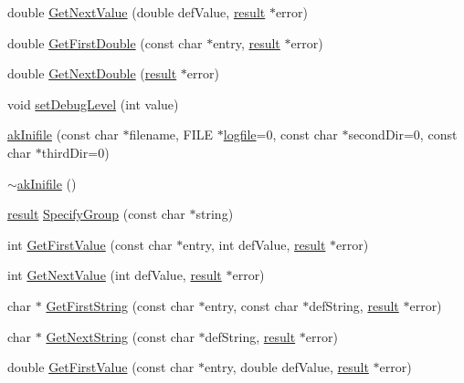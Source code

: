 \begin{DoxyCompactItemize}
\item 
double \hyperlink{classakInifile_a563076300ca6e4dd46850b27bc326aa6}{Get\-Next\-Value} (double def\-Value, \hyperlink{classInifile_a42a1cfa6fc8618c8b28d449626f0ecde}{result} $\ast$error)
\item 
double \hyperlink{classakInifile_a8121e22f645f39782132d198edc7ebd7}{Get\-First\-Double} (const char $\ast$entry, \hyperlink{classInifile_a42a1cfa6fc8618c8b28d449626f0ecde}{result} $\ast$error)
\item 
double \hyperlink{classakInifile_ad9c214f487ee936f5f8e83851a8e74e2}{Get\-Next\-Double} (\hyperlink{classInifile_a42a1cfa6fc8618c8b28d449626f0ecde}{result} $\ast$error)
\item 
void \hyperlink{classakInifile_a6832e33e59ce64f1a278d9abce9b9739}{set\-Debug\-Level} (int value)
\item 
\hyperlink{classakInifile_a1e9d24ec7cccf0bc5897ec53fe71e9d9}{ak\-Inifile} (const char $\ast$filename, F\-I\-L\-E $\ast$\hyperlink{classakInifile_a9c55ea25efdedced0815835562454354}{logfile}=0, const char $\ast$second\-Dir=0, const char $\ast$third\-Dir=0)
\item 
\hyperlink{classakInifile_abf7f09a88016cafb4b7d3a7baa7f25f9}{$\sim$ak\-Inifile} ()
\item 
\hyperlink{classInifile_a42a1cfa6fc8618c8b28d449626f0ecde}{result} \hyperlink{classakInifile_a39eba69b84b960c5ed456ee817f9e5c8}{Specify\-Group} (const char $\ast$string)
\item 
int \hyperlink{classakInifile_ae17125c1f87eab81b1843f33cf68a949}{Get\-First\-Value} (const char $\ast$entry, int def\-Value, \hyperlink{classInifile_a42a1cfa6fc8618c8b28d449626f0ecde}{result} $\ast$error)
\item 
int \hyperlink{classakInifile_a8d14c6541da3f0ab9de6c788bbbabc42}{Get\-Next\-Value} (int def\-Value, \hyperlink{classInifile_a42a1cfa6fc8618c8b28d449626f0ecde}{result} $\ast$error)
\item 
char $\ast$ \hyperlink{classakInifile_a90d845922ec84252ce460555cc984c10}{Get\-First\-String} (const char $\ast$entry, const char $\ast$def\-String, \hyperlink{classInifile_a42a1cfa6fc8618c8b28d449626f0ecde}{result} $\ast$error)
\item 
char $\ast$ \hyperlink{classakInifile_a5508037e2add9c20cf43dda40e8870d7}{Get\-Next\-String} (const char $\ast$def\-String, \hyperlink{classInifile_a42a1cfa6fc8618c8b28d449626f0ecde}{result} $\ast$error)
\item 
double \hyperlink{classakInifile_a84e553a71b399b79190a6d3215efac91}{Get\-First\-Value} (const char $\ast$entry, double def\-Value, \hyperlink{classInifile_a42a1cfa6fc8618c8b28d449626f0ecde}{result} $\ast$error)

\end{DoxyCompactItemize}
